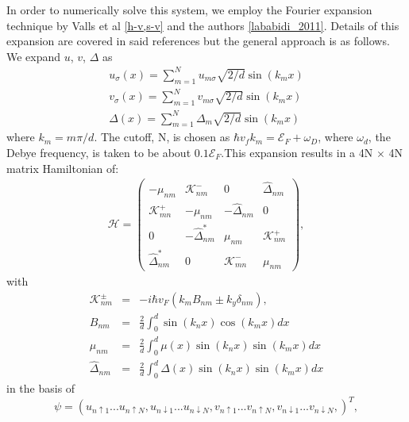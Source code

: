 \documentclass[11pt,revtex,aps]{report}
\begin{document}
In order to numerically solve this system, we employ the Fourier expansion technique by Valls et al \ref{h-v,s-v} and the authors \ref{lababidi_2011}. Details of this expansion are covered in said references but the general approach is as follows.
We expand $u$, $v$, $\Delta$ as 
\begin{eqnarray}
u_{\sigma}(x)=\sum^N_{m=1} u_{m\sigma}\sqrt{2/d} \sin(k_m x)\\
v_{\sigma}(x)=\sum^N_{m=1} v_{m\sigma}\sqrt{2/d} \sin(k_m x)\\
\Delta(x)=\sum^N_{m=1} \Delta_{m}\sqrt{2/d} \sin(k_m x)
\end{eqnarray}
where %
$k_m=m \pi /d$. The cutoff, N, is chosen as $\hbar  v_f k_m=\mathcal{E}_F + \omega_D$, where $\omega_d$, the Debye frequency, is taken to be about $0.1 \mathcal{E}_F$.This expansion results in a 4N $\times$ 4N matrix Hamiltonian of:
\begin{eqnarray}
&\mathcal{H}=\left(
\begin{array}{cccc}
-\mu_{nm} &  \mathcal{K}^-_{nm} & 0 & \hat{\Delta}_{nm} \\
\mathcal{K}^+_{mn}  & -\mu_{nm}  & -\hat{\Delta}_{nm} & 0 \\
0 & -\hat{\Delta}_{nm}^\ast  & \mu_{nm} &  \mathcal{K}^+_{nm}\\
\hat{\Delta}_{nm}^\ast & 0 &  \mathcal{K}^-_{mn}  & \mu_{nm}
\end{array}\label{fkmodel}
\right),&
\end{eqnarray}
with
\begin{eqnarray}
\mathcal{K}^{\pm}_{nm}&=& -i\hbar  v_F (k_m B_{nm} \pm  k_y \delta_{nm}),\\
B_{nm} &=& \frac{2}{d}\int^d_0  \sin(k_n x) \cos(k_m x) dx\\
\mu_{nm}&=& \frac{2}{d}\int^d_0 \mu(x) \sin(k_n x) \sin(k_m x) dx\\
\hat{\Delta}_{nm}&=&  \frac{2}{d}\int^d_0 \Delta(x) \sin(k_n x) \sin(k_m x) dx
\end{eqnarray}
in the basis of
\begin{equation*}
\psi=  \left ( u_{n\uparrow1}...u_{n\uparrow N}, u_{n\downarrow1}...u_{n\downarrow N}, v_{n\uparrow1}...v_{n\uparrow N}, v_{n\downarrow1}...v_{n\downarrow N}, \right )^T,
\end{equation*} 
\end{document}
